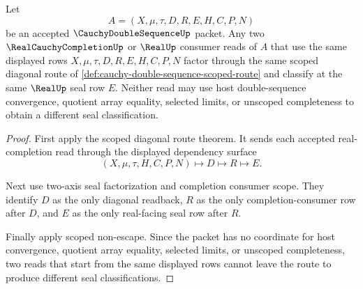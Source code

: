 \begin{theorem}
\label{thm:cauchy-double-sequence-seal-route-determinacy}
Let
$$
A=(X,\mu,\tau,D,R,E,H,C,P,N)
$$
be an accepted $\CauchyDoubleSequenceUp$ packet. Any two $\RealCauchyCompletionUp$ or $\RealUp$ consumer reads of $A$ that use the same displayed rows $X,\mu,\tau,D,R,E,H,C,P,N$ factor through the same scoped diagonal route of \autoref{def:cauchy-double-sequence-scoped-route} and classify at the same $\RealUp$ seal row $E$. Neither read may use host double-sequence convergence, quotient array equality, selected limits, or unscoped completeness to obtain a different seal classification.
\end{theorem}
\begin{proof}
First apply the scoped diagonal route theorem. It sends each accepted real-completion read through the displayed dependency surface
$$
(X,\mu,\tau,H,C,P,N)\longmapsto D\longmapsto R\longmapsto E.
$$

Next use two-axis seal factorization and completion consumer scope. They identify $D$ as the only diagonal readback, $R$ as the only completion-consumer row after $D$, and $E$ as the only real-facing seal row after $R$.

Finally apply scoped non-escape. Since the packet has no coordinate for host convergence, quotient array equality, selected limits, or unscoped completeness, two reads that start from the same displayed rows cannot leave the route to produce different seal classifications.
\end{proof}

